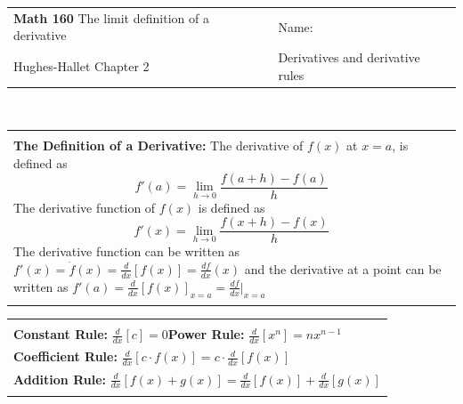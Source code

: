 \documentclass[12pt]{report}
\newenvironment{boxe}
    {\begin{center}
    \begin{tabular}{|p{0.9\textwidth}|}
    \hline\\
    }
    { 
    \\\\\hline
    \end{tabular} 
    \end{center}
    }
\begin{document}
\begin{tabular*}{\textwidth}{@{\extracolsep{\fill}}ll}
\textbf{Math 160} The limit definition of a derivative & \;\;Name: \hrulefill \\
 Hughes-Hallet Chapter 2& Derivatives and derivative rules\hspace{1in}  \\
\hline\hline
\end{tabular*} \\



\begin{boxe}  \textbf{The Definition of a Derivative:} The derivative of $f(x)$ at $x=a$, is defined as 
$$f'(a)=\lim_{h\to 0}\frac{f(a+h)-f(a)}{h}$$
The derivative function of $f(x)$ is defined as
$$f'(x)=\lim_{h\to 0}\frac{f(x+h)-f(x)}{h}$$
The derivative function can be written as $f'(x)=\dot{f}(x)=\frac{d}{dx}\left[f(x)\right]=\frac{df}{dx}(x)$ and the derivative at a point can be written as $f'(a)=\frac{d}{dx}\left[f(x)\right]_{x=a}=\frac{df}{dx}\big|_{x=a}$
\end{boxe}

\begin{boxe}
\textbf{Constant Rule:} $\displaystyle{\frac{d}{dx}\left[c\right]=0}$\;\;\;\;\;\;\;\;\;\;\textbf{Power Rule:} $\displaystyle{\frac{d}{dx}\left[x^n\right]=nx^{n-1}}$\\
\textbf{Coefficient Rule:} $\displaystyle{\frac{d}{dx}\left[c\cdot f(x)\right ]}=\displaystyle{c\cdot \frac{d}{dx}\left[f(x)\right]}$\\
\textbf{Addition Rule:} $\displaystyle{\frac{d}{dx}\left[f(x)+g(x)\right]}=\displaystyle{\frac{d}{dx}\left[f(x)\right]+\frac{d}{dx}\left[g(x)\right]}$
\end{boxe}
\end{document}
